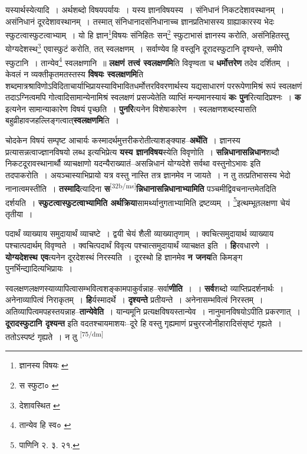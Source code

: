 \documentclass[article,12pt,a4paper]{memoir}
\begin{document}
	यस्यार्थस्येत्यादि । अर्थशब्दो विषयपर्यायः । यस्य ज्ञानविषयस्य । संनिधानं निकटदेशावस्थानम् । असंनिधानं दूरदेशावस्थानम् । तस्मात् संनिधानादसंनिधानाच्च ज्ञानप्रतिभासस्य ग्राह्याकारस्य भेदः स्फुटत्वास्फुटत्वाभ्याम् । यो हि ज्ञान\footnote{ज्ञानस्य विषयः \cite{dp-msA} \cite{dp-edP} \cite{dp-edH} \cite{dp-edE} \cite{dp-edN}}विषयः संनिहितः सन्\footnote{स स्फुटा० \cite{dp-msB} \cite{dp-msC} \cite{dp-msD}} स्फुटाभासं ज्ञानस्य करोति, असंनिहितस्तु योग्यदेशस्थ\footnote{देशावस्थित \cite{dp-msA} \cite{dp-msB} \cite{dp-msC} \cite{dp-edP} \cite{dp-edH} \cite{dp-edE} \cite{dp-edN}} एवास्फुटं करोति, तत् स्वलक्षणम् । सर्वाण्येव हि वस्तूनि दूरादस्फुटानि दृश्यन्ते, समीपे स्फुटानि । तान्येव\footnote{तान्येव हि स्व० \cite{dp-msC}} स्वलक्षणानि ॥ \textbf{लक्षणं तत्त्वं स्वलक्षणमि}ति विवृण्वता च \textbf{धर्मोत्तरेण} तदेव दर्शितम् । केवलं न व्यक्तीकृतमतस्तस्य \textbf{विषयः स्वलक्षणमि}ति शब्दमात्रश्राविणोऽविदिताचार्याभिप्रायस्याविभावितधर्मोत्तरविवरणार्थस्य यद्यसाधारणं पररूपेणामिश्रं रूपं स्वलक्षणं तदाऽग्नित्वमपि गोत्वादिसामान्येनामिश्रं स्वलक्षणं प्रसज्येतेति व्याप्तिं मन्यमानस्यायं \textbf{कः पुन}रित्यादिप्रश्नः । \textbf{क} इत्यनेन सामान्याकारेण विषयं पृच्छति । \textbf{पुनरि}त्यनेन विशेषाकारेण । स्वलक्षणशब्दस्यासति बहुव्रीहावजहल्लिङ्गत्वात्\textbf{स्वलक्षणमि}ति ।
	\pend
      

	  \pstart चोदकेन विषयं सम्पृष्ट आचार्यः कस्मादर्थमुत्तरीकरोतीत्याशङ्क्याह--\textbf{अर्थेति} । ज्ञानस्य प्रत्यासन्नत्वाज्ज्ञानविषयो लब्ध इत्यभिप्रेत्य \textbf{यस्य ज्ञानविषय}स्येति विवृणोति । \textbf{सन्निधानासन्निधान}शब्दौ निकटदूरावस्थानार्थौ व्याचक्षाणो यदन्यैराख्यातं--असन्निधानं योग्यदेशे सर्वथा वस्तुनोऽभावः इति तदपाकरोति । अयञ्चास्याभिप्रायो यत्र वस्तु नास्ति तत्र ज्ञानमेव न जायते । न तु तत्प्रतिभासस्य भेदो नानात्वमस्तीति । \textbf{तस्मादि}त्यादिना \textbf{स}\leavevmode\textsuperscript{\rmlatinfont\tiny [32b/ms]}\textbf{न्निधानासन्निधानाभ्यामिति} पञ्चमीद्विवचनान्तमेतदिति दर्शयति । \textbf{स्फुटत्वास्फुटत्वाभ्यामिति अर्थक्रिया}सामर्थ्यानुगताभ्यामिति द्रष्टव्यम् । \footnote{पाणिनि २. ३. २१.}इत्थम्भूतलक्षणा चेयं तृतीया ।
	\pend
      

	  \pstart पदार्थं व्याख्याय समुदायार्थं व्याचष्टे । द्वयी चेयं शैली व्याख्यातृणाम् । क्वचित्समुदायार्थ व्याख्याय पश्चात्पदार्थम् विवृण्वते । क्वचित्पदार्थं विवृत्य पश्चात्समुदायार्थं व्याचक्षत इति । \textbf{हि}रवधारणे । \textbf{योग्यदेशस्थ एव}त्यनेन दूरदेशस्थं निरस्यति । दूरस्थो हि ज्ञानमेव \textbf{न जनय}ति किमङ्ग पुनर्भिन्द्यादित्यभिप्रायः ।
	\pend
      

	  \pstart स्वलक्षणलक्षणस्याव्यापित्वासम्भवित्वशङ्कामपाकुर्वन्नाह--सर्वा\textbf{णीति} । । \textbf{सर्व}शब्दो व्याप्तिप्रदर्शनार्थः । अनेनाव्यापित्वं निराकृतम् । \textbf{हि}र्यस्मादर्थे । \textbf{दृश्यन्ते} प्रतीयन्ते । अनेनासम्भवित्वं निरस्तम् । अतिव्यापित्वमपहस्तयन्नाह--\textbf{तान्येवेति} । यान्यमूनि प्रत्यक्षविषयस्तान्येव । नानुमानविषयोऽपीति प्रकरणात् । \textbf{दूरादस्फुटानि दृश्यन्त} इति वदतश्चायमाशयः--दूरे हि वस्तु गृह्यमाणं प्रचुररजोनीहारादिसंसृष्टं गृह्यते । ततोऽस्पष्टं गृह्यते । न तु  \leavevmode\textsuperscript{\rmlatinfont\tiny [75/dm]} 
	  
\end{document}
